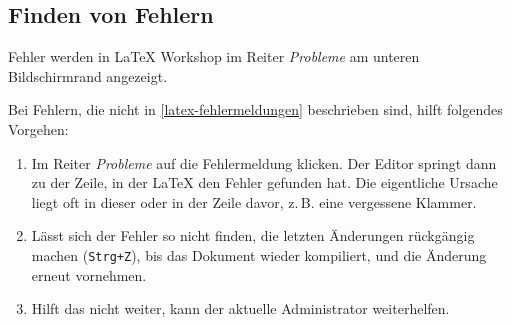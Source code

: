 \subsection{Finden von Fehlern}
\label{latex-fehler-finden}
Fehler werden in LaTeX Workshop im Reiter \textit{Probleme} am unteren Bildschirmrand angezeigt.

Bei Fehlern, die nicht in \autoref{latex-fehlermeldungen} beschrieben sind, hilft folgendes Vorgehen:
\begin{enumerate}
	\item Im Reiter \textit{Probleme} auf die Fehlermeldung klicken. Der Editor springt dann zu der Zeile, in der \LaTeX{} den Fehler gefunden hat. Die eigentliche Ursache liegt oft in dieser oder in der Zeile davor, z.\,B. eine vergessene Klammer.
	\item Lässt sich der Fehler so nicht finden, die letzten Änderungen rückgängig machen (\texttt{Strg+Z}), bis das Dokument wieder kompiliert, und die Änderung erneut vornehmen.
	\item Hilft das nicht weiter, kann der aktuelle Administrator weiterhelfen.
\end{enumerate}
